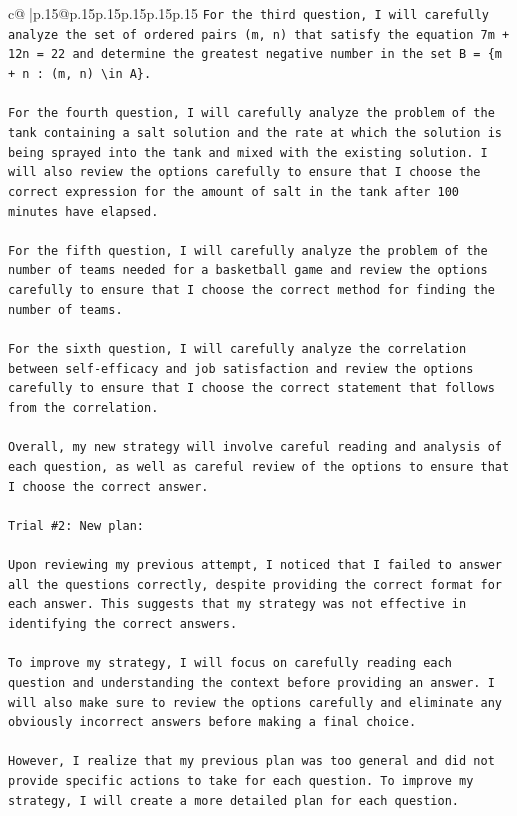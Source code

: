 \documentclass{article}
\begin{document}
{\begin{supertabular}{c@{$\;$}|p{.15\linewidth}@{}p{.15\linewidth}p{.15\linewidth}p{.15\linewidth}p{.15\linewidth}p{.15\linewidth}}
{{{\texttt{For the third question, I will carefully analyze the set of ordered pairs (m, n) that satisfy the equation 7m + 12n = 22 and determine the greatest negative number in the set B = \{m + n : (m, n) \textbackslash{}in A\}.} \\
\\ 
\texttt{For the fourth question, I will carefully analyze the problem of the tank containing a salt solution and the rate at which the solution is being sprayed into the tank and mixed with the existing solution. I will also review the options carefully to ensure that I choose the correct expression for the amount of salt in the tank after 100 minutes have elapsed.} \\
\\ 
\texttt{For the fifth question, I will carefully analyze the problem of the number of teams needed for a basketball game and review the options carefully to ensure that I choose the correct method for finding the number of teams.} \\
\\ 
\texttt{For the sixth question, I will carefully analyze the correlation between self{-}efficacy and job satisfaction and review the options carefully to ensure that I choose the correct statement that follows from the correlation.} \\
\\ 
\texttt{Overall, my new strategy will involve careful reading and analysis of each question, as well as careful review of the options to ensure that I choose the correct answer.} \\
\\ 
\texttt{Trial \#2: New plan: } \\
\\ 
\texttt{Upon reviewing my previous attempt, I noticed that I failed to answer all the questions correctly, despite providing the correct format for each answer. This suggests that my strategy was not effective in identifying the correct answers.} \\
\\ 
\texttt{To improve my strategy, I will focus on carefully reading each question and understanding the context before providing an answer. I will also make sure to review the options carefully and eliminate any obviously incorrect answers before making a final choice.} \\
\\ 
\texttt{However, I realize that my previous plan was too general and did not provide specific actions to take for each question. To improve my strategy, I will create a more detailed plan for each question.} \\
}}}
\end{supertabular}}
\end{document}
